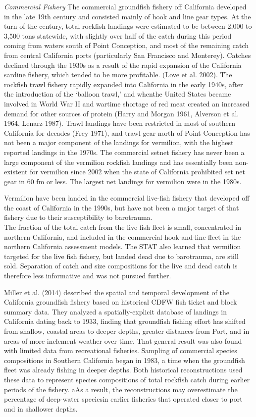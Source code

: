 \documentclass[
  english,
  a4paper,
]{article}
\begin{document}
\emph{Commercial Fishery}
The commercial groundfish fishery off California developed in the late 19th century and consisted mainly of hook and line gear types. At the turn of the century, total rockfish landings were estimated to be between 2,000 to 3,500 tons statewide, with slightly over half of the catch during this period coming from waters south of Point Conception, and most of the remaining catch from central California ports (particularly San Francisco and Monterey). Catches declined through the 1930s as a result of the rapid expansion of the California sardine fishery, which tended to be more profitable.
(Love et al. 2002). The rockfish trawl fishery rapidly expanded into California in the early 1940s, after the introduction of the `balloon trawl,' and whenthe United States became involved in World War II and wartime shortage of red
meat created an increased demand for other sources of protein (Harry and Morgan 1961, Alverson et al. 1964, Lenarz 1987). Trawl landings have been restricted in most of southern California for decades (Frey 1971), and trawl gear north of Point Conception has not been a major component of the landings for vermilion, with the highest reported landings in the 1970s. The commercial setnet fishery has never been a large component of the vermilion rockfish landings and has essentially been non-existent for vermilion since 2002 when the state of California prohibited set net gear in 60 fm or less. The largest net landings for vermilion were in the 1980s.

Vermilion have been landed in the commercial live-fish fishery that developed off the coast of
California in the 1990s, but have not been a major target of that fishery due to their susceptibility to barotrauma.\\
The fraction of the total catch
from the live fish fleet is small, concentrated in northern California, and included in the commercial hook-and-line
fleet in the northern California assessment models. The STAT also learned that vermilion
targeted for the live fish fishery, but landed
dead due to barotrauma, are still sold. Separation of catch and size compositions for the live and dead catch is therefore less informative and was not pursued further.

Miller et al. (2014) described the spatial and temporal development of the
California groundfish fishery based on historical CDFW fish ticket and block summary data. They analyzed a spatially-explicit database of
landings in California dating back to 1933, finding that groundfish fishing effort
has shifted from shallow, coastal areas to deeper depths, greater distances from
Port, and in areas of more inclement weather over time. That general result was also found with limited data from recreational fisheries. Sampling of commercial species compositions in Southern California
began in 1983, a time when the groundfish fleet was already fishing in deeper depths.
Both historical reconstructions used these data to represent species compositions of
total rockfish catch during earlier periods of the fishery. aAs a result, the reconstructions may
overestimate the percentage of deep-water speciesin earlier fisheries that operated closer
to port and in shallower depths.
\end{document}
